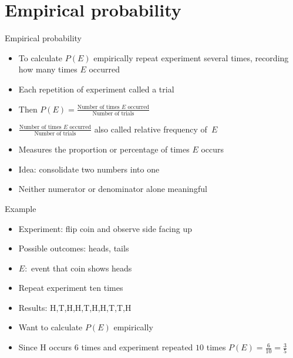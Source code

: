 \documentclass{beamer}
\theoremstyle{definition}
\begin{document}
\section{Empirical probability}
\begin{frame}{Empirical probability}
\begin{itemize}
\item To calculate $P\left(E\right)$ \alert{empirically}
repeat experiment several times, recording how
many times $E$ occurred
\item Each repetition of experiment called a \alert{trial}
\item Then $P\left(E\right)=
\frac{\text{Number of times $E$ occurred}}
{\text{Number of trials}}$
\item $\frac{\text{Number of times $E$ occurred}}
{\text{Number of trials}}$ also called
\alert{relative frequency of~$E$}
\item Measures the \alert{proportion} or \alert{percentage}
of times $E$ occurs
\item Idea: consolidate two numbers into one
\item Neither numerator or denominator alone meaningful
\end{itemize}
\end{frame}

\begin{frame}{Example}
\begin{itemize}
\item Experiment: flip coin and observe side facing up
\item Possible outcomes: heads, tails
\item $E:$ event that coin shows heads
\item Repeat experiment ten times
\item Results: H,T,H,H,T,H,H,T,T,H
\item Want to calculate $P\left(E\right)$ empirically
\item Since H occurs $6$ times
and experiment repeated $10$ times
$P\left(E\right)=\frac{6}{10}=\frac{3}{5}$
\end{itemize}
\end{frame}
\end{document}

